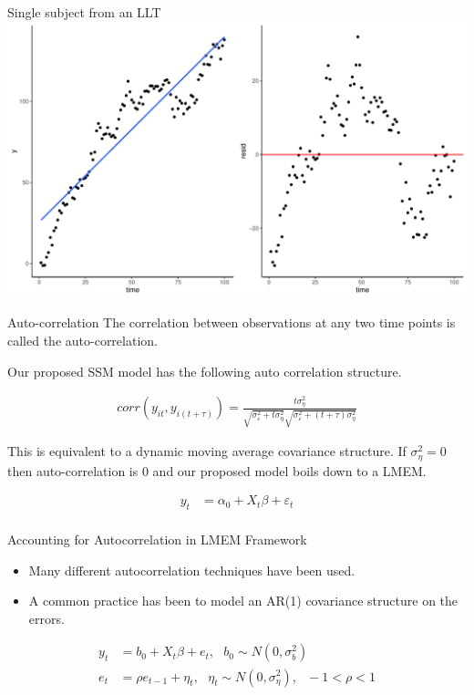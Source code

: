 \documentclass[
  ignorenonframetext,
]{beamer}
\providecommand{\tightlist}{%
  \setlength{\itemsep}{0pt}\setlength{\parskip}{0pt}}
\begin{document}
\begin{frame}{Single subject from an LLT}
\protect\hypertarget{single-subject-from-an-llt}{}
\includegraphics{Prez4_files/figure-beamer/unnamed-chunk-11-1.pdf}
\end{frame}

\begin{frame}{Auto-correlation}
\protect\hypertarget{auto-correlation}{}
The correlation between observations at any two time points is called
the auto-correlation.

Our proposed SSM model has the following auto correlation structure.

\begin{align*}
corr(y_{it}, y_{i(t+\tau)}) = \frac{t\sigma^2_\eta}{\sqrt{\sigma^2_\varepsilon + t\sigma^2_\eta}\sqrt{\sigma^2_\varepsilon + (t+\tau)\sigma^2_\eta}}
\end{align*}

This is equivalent to a dynamic moving average covariance structure. If
\(\sigma^2_\eta = 0\) then auto-correlation is 0 and our proposed model
boils down to a LMEM.

\begin{align*}
y_t &= \alpha_0 + X_t\beta
+ \varepsilon_t\\
\end{align*}
\end{frame}

\begin{frame}{Accounting for Autocorrelation in LMEM Framework}
\protect\hypertarget{accounting-for-autocorrelation-in-lmem-framework}{}
\begin{itemize}
\tightlist
\item
  Many different autocorrelation techniques have been used.
\item
  A common practice has been to model an AR(1) covariance structure on
  the errors.
\end{itemize}

\begin{equation*}
\begin{aligned}
y_t &= b_0 + X_t \beta + e_t, \ \ \ b_0\sim N(0, \sigma^2_b)\\
e_t &= \rho e_{t-1} + \eta_t, \ \ \ \eta_t \sim N(0, \sigma^2_\eta), \ \ \ -1 < \rho < 1
\end{aligned}
\end{equation*}
\end{frame}
\end{document}
